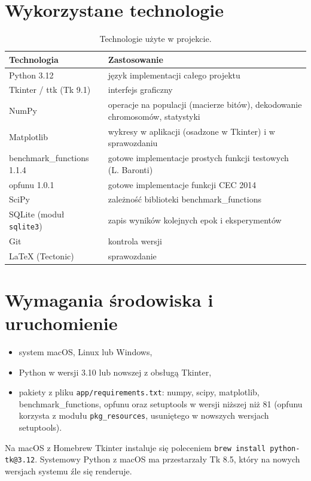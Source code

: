 \documentclass[11pt,a4paper]{article}
\begin{document}
\section{Wykorzystane technologie}

\begin{table}[H]
\centering
\begin{tabularx}{\textwidth}{lX}
\toprule
Technologia & Zastosowanie \\
\midrule
Python 3.12 & język implementacji całego projektu \\
Tkinter / ttk (Tk 9.1) & interfejs graficzny \\
NumPy & operacje na populacji (macierze bitów), dekodowanie chromosomów, statystyki \\
Matplotlib & wykresy w aplikacji (osadzone w Tkinter) i w sprawozdaniu \\
benchmark\_functions 1.1.4 & gotowe implementacje prostych funkcji testowych (L. Baronti) \\
opfunu 1.0.1 & gotowe implementacje funkcji CEC 2014 \\
SciPy & zależność biblioteki benchmark\_functions \\
SQLite (moduł \texttt{sqlite3}) & zapis wyników kolejnych epok i eksperymentów \\
Git & kontrola wersji \\
\LaTeX{} (Tectonic) & sprawozdanie \\
\bottomrule
\end{tabularx}
\caption{Technologie użyte w projekcie.}
\end{table}

\section{Wymagania środowiska i uruchomienie}

\begin{itemize}
  \item system macOS, Linux lub Windows,
  \item Python w wersji 3.10 lub nowszej z obsługą Tkinter,
  \item pakiety z pliku \texttt{app/requirements.txt}: numpy, scipy, matplotlib,
        benchmark\_functions, opfunu oraz setuptools w wersji niższej niż 81
        (opfunu korzysta z modułu \texttt{pkg\_resources}, usuniętego w nowszych wersjach setuptools).
\end{itemize}

Na macOS z Homebrew Tkinter instaluje się poleceniem \texttt{brew install python-tk@3.12}.
Systemowy Python z macOS ma przestarzały Tk 8.5, który na nowych wersjach systemu źle się renderuje.
\end{document}
